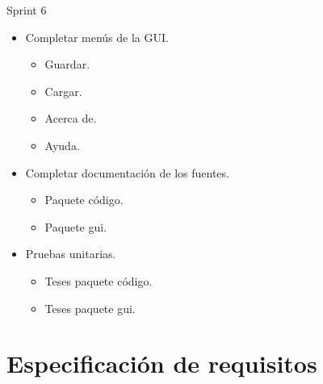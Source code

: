 Sprint 6 
\begin{itemize}
\item Completar menús de la GUI.
	\begin{itemize}
		\item Guardar.
		\item Cargar.
		\item Acerca de.
		\item Ayuda.
	\end{itemize}
\item Completar documentación de los fuentes.
	\begin{itemize}
		\item Paquete código.
		\item Paquete gui.
	\end{itemize}
\item Pruebas unitarias.
	\begin{itemize}
		\item Teses paquete código.
		\item Teses paquete gui.
	\end{itemize}
\end{itemize}




\section{Especificación de requisitos}



